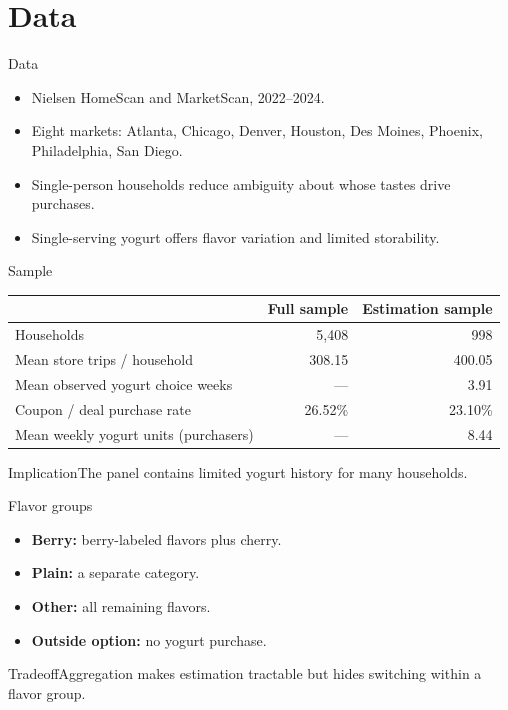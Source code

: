 \documentclass[aspectratio=169,11pt]{beamer}
\begin{document}
\section{Data}
\begin{frame}{Data}
\begin{itemize}
\item Nielsen HomeScan and MarketScan, 2022--2024.
\item Eight markets: Atlanta, Chicago, Denver, Houston, Des Moines, Phoenix, Philadelphia, San Diego.
\item Single-person households reduce ambiguity about whose tastes drive purchases.
\item Single-serving yogurt offers flavor variation and limited storability.
\end{itemize}
\end{frame}

\begin{frame}{Sample}
\centering
\begin{tabular}{lrr}\toprule
 & Full sample & Estimation sample\\\midrule
Households & 5,408 & 998\\
Mean store trips / household & 308.15 & 400.05\\
Mean observed yogurt choice weeks & --- & 3.91\\
Coupon / deal purchase rate & 26.52\% & 23.10\%\\
Mean weekly yogurt units (purchasers) & --- & 8.44\\\bottomrule
\end{tabular}
\vspace{4mm}
\begin{block}{Implication}The panel contains limited yogurt history for many households.\end{block}
\end{frame}

\begin{frame}{Flavor groups}
\begin{itemize}
\item \textbf{Berry:} berry-labeled flavors plus cherry.
\item \textbf{Plain:} a separate category.
\item \textbf{Other:} all remaining flavors.
\item \textbf{Outside option:} no yogurt purchase.
\end{itemize}\begin{block}{Tradeoff}Aggregation makes estimation tractable but hides switching within a flavor group.\end{block}
\end{frame}
\end{document}
